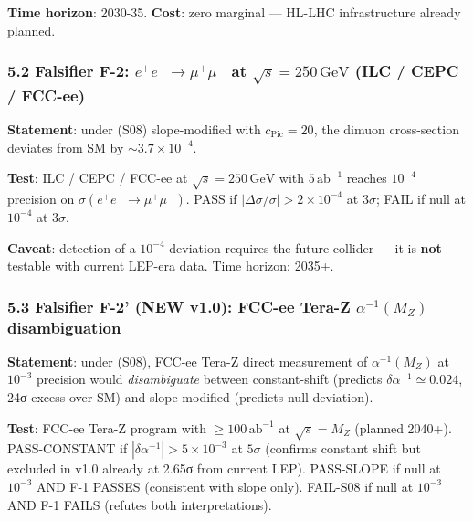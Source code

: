 \documentclass[
  11pt,
  a4paper,
]{article}
\begin{document}
\textbf{Time horizon}: 2030-35. \textbf{Cost}: zero marginal --- HL-LHC infrastructure already planned.

\hypertarget{falsifier-f-2-ee--to-mumu--at-sqrt-s-250mathrmgev-ilc-cepc-fcc-ee}{%
\subsubsection{\texorpdfstring{5.2 Falsifier F-2: \(e^+e^- \to \mu^+\mu^-\) at \(\sqrt s = 250\,\mathrm{GeV}\) (ILC / CEPC / FCC-ee)}{5.2 Falsifier F-2: e\^{}+e\^{}- \textbackslash to \textbackslash mu\^{}+\textbackslash mu\^{}- at \textbackslash sqrt s = 250\textbackslash,\textbackslash mathrm\{GeV\} (ILC / CEPC / FCC-ee)}}\label{falsifier-f-2-ee--to-mumu--at-sqrt-s-250mathrmgev-ilc-cepc-fcc-ee}}

\textbf{Statement}: under (S08) slope-modified with \(c_{\mathrm{Pic}} = 20\), the dimuon cross-section deviates from SM by \(\sim 3.7 \times 10^{-4}\).

\textbf{Test}: ILC / CEPC / FCC-ee at \(\sqrt s = 250\,\mathrm{GeV}\) with \(5\,\mathrm{ab}^{-1}\) reaches \(10^{-4}\) precision on \(\sigma(e^+e^- \to \mu^+\mu^-)\). PASS if \(|\Delta \sigma / \sigma| > 2\times 10^{-4}\) at \(3\sigma\); FAIL if null at \(10^{-4}\) at \(3\sigma\).

\textbf{Caveat}: detection of a \(10^{-4}\) deviation requires the future collider --- it is \textbf{not} testable with current LEP-era data. Time horizon: 2035+.

\hypertarget{falsifier-f-2-new-v1.0-fcc-ee-tera-z-alpha-1m_z-disambiguation}{%
\subsubsection{\texorpdfstring{5.3 Falsifier F-2' (NEW v1.0): FCC-ee Tera-Z \(\alpha^{-1}(M_Z)\) disambiguation}{5.3 Falsifier F-2' (NEW v1.0): FCC-ee Tera-Z \textbackslash alpha\^{}\{-1\}(M\_Z) disambiguation}}\label{falsifier-f-2-new-v1.0-fcc-ee-tera-z-alpha-1m_z-disambiguation}}

\textbf{Statement}: under (S08), FCC-ee Tera-Z direct measurement of \(\alpha^{-1}(M_Z)\) at \(10^{-3}\) precision would \emph{disambiguate} between constant-shift (predicts \(\delta\alpha^{-1} \simeq 0.024\), 24σ excess over SM) and slope-modified (predicts null deviation).

\textbf{Test}: FCC-ee Tera-Z program with \(\ge 100\,\mathrm{ab}^{-1}\) at \(\sqrt s = M_Z\) (planned 2040+). PASS-CONSTANT if \(|\delta\alpha^{-1}| > 5 \times 10^{-3}\) at \(5\sigma\) (confirms constant shift but excluded in v1.0 already at 2.65σ from current LEP). PASS-SLOPE if null at \(10^{-3}\) AND F-1 PASSES (consistent with slope only). FAIL-S08 if null at \(10^{-3}\) AND F-1 FAILS (refutes both interpretations).
\end{document}
